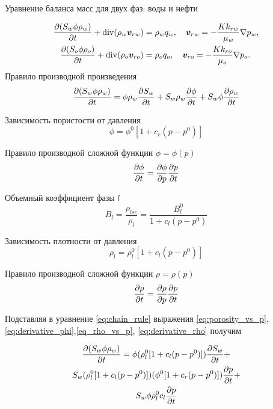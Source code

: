 



Уравнение баланса масс для двух фаз: воды и нефти

\begin{equation}\label{eq:common_equation_multiphase_rho}
\begin{split}
	\dfrac{\partial (S_w \phi \rho_w)}{\partial t} + \operatorname{div}(\rho_w \bm{v}_{rw})    &= \rho_w q_w, \quad \bm{v}_{rw}=-\frac{K k_{rw}}{\mu_w}\nabla p_w,\\
	\dfrac{\partial (S_o \phi \rho_o)}{\partial t} + \operatorname{div}(\rho_o \bm{v}_{ro})  &= \rho_o q_o, \quad \bm{v}_{ro}=-\frac{K k_{ro}}{\mu_o}\nabla p_o.
\end{split}
\end{equation}
Правило производной произведения
\begin{equation}\label{eq:chain_rule}
\dfrac{\partial (S_w \phi \rho_w)}{\partial t}=\phi \rho_w \dfrac{\partial S_w}{\partial t}+S_w \rho_w \dfrac{\partial \phi}{\partial t}+S_w \phi \dfrac{\partial \rho_w}{\partial t}
\end{equation}

Зависимость пористости от давления
\begin{equation}\label{eq:porosity_vs_p}
\phi = \phi^0 [1+c_r (p-p^0)]
\end{equation}

Правило производной сложной функции $\phi=\phi(p)$
\begin{equation}\label{eq:derivative_phi}
\dfrac{\partial \phi}{\partial t}=\dfrac{\partial \phi}{\partial p} \dfrac{\partial p}{\partial t}
\end{equation}

Объемный коэффициент фазы $l$
\begin{equation}\label{eq:FVF}
B_l=\frac{\rho_{lsc}}{\rho_l}=\frac{B^0_l}{1+c_l(p-p^0)}
\end{equation}

Зависимость плотности от давления
\begin{equation}\label{eq_rho_vs_p}
\rho_l=\rho^0_l[1+c_l(p-p^0)]
\end{equation}

Правило производной сложной функции $\rho=\rho(p)$
\begin{equation}\label{eq:derivative_rho}
\dfrac{\partial \rho}{\partial t}=\dfrac{\partial \rho}{\partial p} \dfrac{\partial p}{\partial t}
\end{equation}

Подставляя в уравнение \ref{eq:chain_rule} выражения \ref{eq:porosity_vs_p}, \ref{eq:derivative_phi},\ref{eq_rho_vs_p}, \ref{eq:derivative_rho} получим

\begin{multline}\label{eq:chain_rule}
\dfrac{\partial (S_w \phi \rho_w)}{\partial t}=\phi (\rho^0_l[1+c_l(p-p^0)]) \dfrac{\partial S_w}{\partial t}+ \\
S_w (\rho^0_l[1+c_l(p-p^0)]) (\phi^0[1+c_r (p-p^0)]) \dfrac{\partial p}{\partial t}+ \\
S_w \phi \rho^0_l c_l \dfrac{\partial p}{\partial t}
\end{multline}



